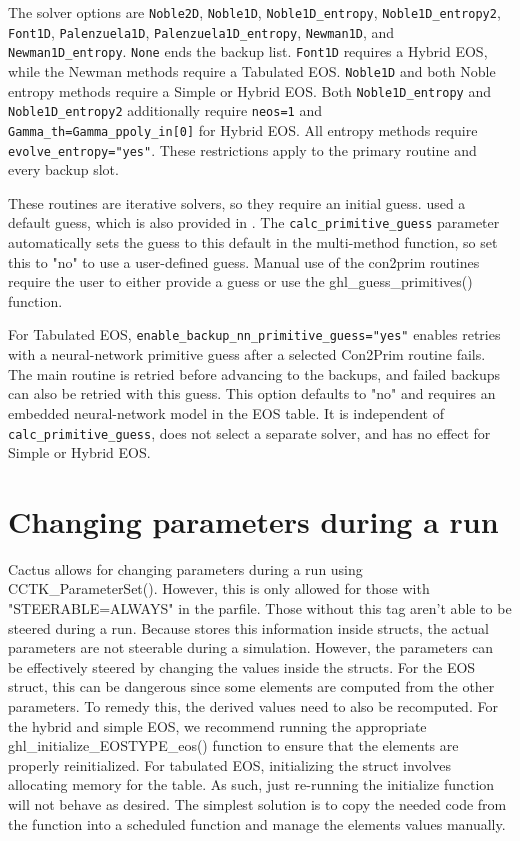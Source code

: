 \documentclass{article}
\begin{document}
The solver options are \texttt{Noble2D}, \texttt{Noble1D},
\texttt{Noble1D\_entropy}, \texttt{Noble1D\_entropy2}, \texttt{Font1D},
\texttt{Palenzuela1D}, \texttt{Palenzuela1D\_entropy}, \texttt{Newman1D},
and \texttt{Newman1D\_entropy}. \texttt{None} ends the backup list.
\texttt{Font1D} requires a Hybrid EOS, while the Newman methods require a
Tabulated EOS. \texttt{Noble1D} and both Noble entropy methods require a
Simple or Hybrid EOS. Both \texttt{Noble1D\_entropy} and
\texttt{Noble1D\_entropy2} additionally require \texttt{neos=1} and
\texttt{Gamma\_th=Gamma\_ppoly\_in[0]} for Hybrid EOS. All entropy methods
require \texttt{evolve\_entropy="yes"}. These restrictions apply to the
primary routine and every backup slot.

These routines are iterative solvers, so they require an initial guess.
\igm{} used a default guess, which is also provided in \grhayl.
The \texttt{calc\_primitive\_guess} parameter automatically sets the
guess to this default in the multi-method function, so set this to
"no" to use a user-defined guess. Manual use of the con2prim
routines require the user to either provide a guess or use the
ghl\_guess\_primitives() function.

For Tabulated EOS, \texttt{enable\_backup\_nn\_primitive\_guess="yes"}
enables retries with a neural-network primitive guess after a selected
Con2Prim routine fails. The main routine is retried before advancing to
the backups, and failed backups can also be retried with this guess.
This option defaults to "no" and requires an embedded neural-network model
in the EOS table. It is independent of \texttt{calc\_primitive\_guess},
does not select a separate solver, and has no effect for Simple or Hybrid EOS.

\section{Changing parameters during a run}

Cactus allows for changing parameters during a run using CCTK\_ParameterSet().
However, this is only allowed for those with "STEERABLE=ALWAYS" in the parfile.
Those without this tag aren't able to be steered during a run. Because \glib{}
stores this information inside \grhayl{} structs, the actual parameters are not
steerable during a simulation. However, the parameters can be effectively steered
by changing the values inside the structs. For the EOS struct, this can be
dangerous since some elements are computed from the other parameters. To remedy
this, the derived values need to also be recomputed. For the hybrid and simple EOS,
we recommend running the appropriate ghl\_initialize\_EOSTYPE\_eos() function
to ensure that the elements are properly reinitialized. For tabulated EOS,
initializing the struct involves allocating memory for the table. As such,
just re-running the initialize function will not behave as desired. The simplest
solution is to copy the needed code from the \grhayl{} function into a scheduled
function and manage the elements values manually.
\end{document}
